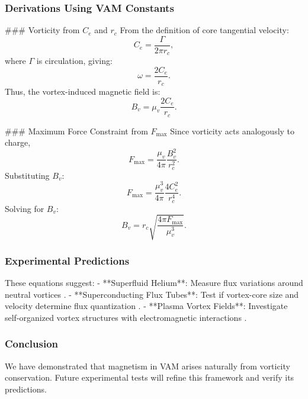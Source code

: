     \subsubsection{Derivations Using VAM Constants}
    ### Vorticity from $C_e$ and $r_c$
    From the definition of core tangential velocity:
    \begin{equation}
        C_e = \frac{\Gamma}{2\pi r_c},
    \end{equation}
    where $\Gamma$ is circulation, giving:
    \begin{equation}
        \omega = \frac{2 C_e}{r_c}.
    \end{equation}
    Thus, the vortex-induced magnetic field is:
    \begin{equation}
        B_v = \mu_v \frac{2 C_e}{r_c}.
    \end{equation}

    ### Maximum Force Constraint from $F_{\text{max}}$
    Since vorticity acts analogously to charge,
    \begin{equation}
        F_{\text{max}} = \frac{\mu_v}{4\pi} \frac{B_v^2}{r_c^2}.
    \end{equation}
    Substituting $B_v$:
    \begin{equation}
        F_{\text{max}} = \frac{\mu_v^3}{4\pi} \frac{4 C_e^2}{r_c^4}.
    \end{equation}
    Solving for $B_v$:
    \begin{equation}
        B_v = r_c \sqrt{\frac{4\pi F_{\text{max}}}{\mu_v^3}}.
    \end{equation}

    \subsubsection{Experimental Predictions}
    These equations suggest:
    - **Superfluid Helium**: Measure flux variations around neutral vortices \cite{initial_vortex_magnetometers}.
    - **Superconducting Flux Tubes**: Test if vortex-core size and velocity determine flux quantization \cite{superconducting_flux_focusing}.
    - **Plasma Vortex Fields**: Investigate self-organized vortex structures with electromagnetic interactions \cite{plasma_vortex_flows}.

    \subsubsection{Conclusion}
    We have demonstrated that magnetism in VAM arises naturally from vorticity conservation. Future experimental tests will refine this framework and verify its predictions.



